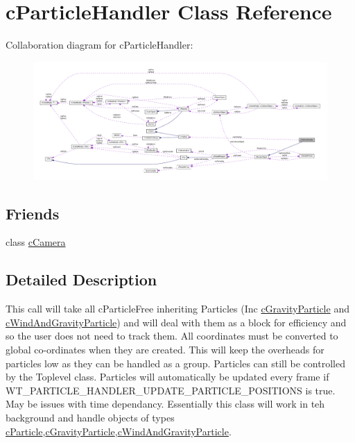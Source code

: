 \hypertarget{classc_particle_handler}{
\section{cParticleHandler Class Reference}
\label{classc_particle_handler}
}


Collaboration diagram for cParticleHandler:\nopagebreak
\begin{figure}[H]
\begin{center}
\leavevmode
\includegraphics[width=400pt]{classc_particle_handler__coll__graph}
\end{center}
\end{figure}
\subsection*{Friends}
\begin{DoxyCompactItemize}
\item 
\hypertarget{classc_particle_handler_a930db2797d94f26b57e430e155ad81ba}{
class \hyperlink{classc_particle_handler_a930db2797d94f26b57e430e155ad81ba}{cCamera}}
\label{classc_particle_handler_a930db2797d94f26b57e430e155ad81ba}

\end{DoxyCompactItemize}


\subsection{Detailed Description}
This call will take all cParticleFree inheriting Particles (Inc \hyperlink{classc_gravity_particle}{cGravityParticle} and \hyperlink{classc_wind_and_gravity_particle}{cWindAndGravityParticle}) and will deal with them as a block for efficiency and so the user does not need to track them. All coordinates must be converted to global co-\/ordinates when they are created. This will keep the overheads for particles low as they can be handled as a group. Particles can still be controlled by the Toplevel class. Particles will automatically be updated every frame if WT\_\-PARTICLE\_\-HANDLER\_\-UPDATE\_\-PARTICLE\_\-POSITIONS is true. May be issues with time dependancy. Essentially this class will work in teh background and handle objects of types \hyperlink{classc_particle}{cParticle},\hyperlink{classc_gravity_particle}{cGravityParticle},\hyperlink{classc_wind_and_gravity_particle}{cWindAndGravityParticle}. 